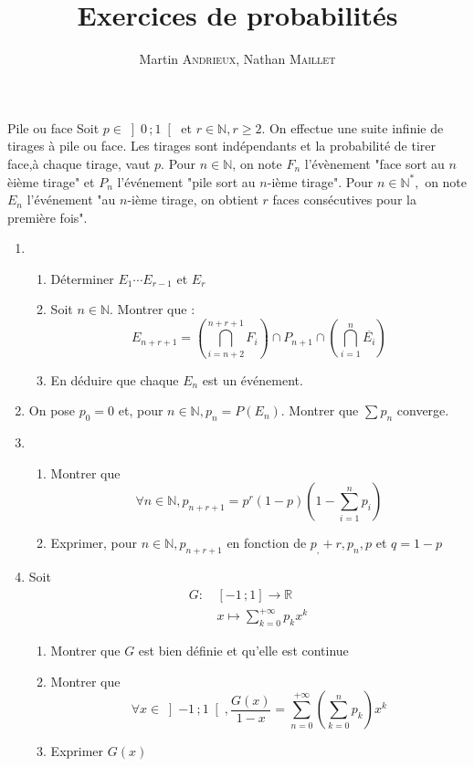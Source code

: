 \documentclass[french, a4paper, 11pt]{article}
\title{Exercices de probabilités}
\author{Martin \textsc{Andrieux}, Nathan \textsc{Maillet}}
\date{}
\newcommand{\N}{\mathbb{N}}   %
\newcommand{\R}{\mathbb{R}}   %
\newcommand{\interoo}[2]{\left]#1\,;#2\right[}   %
\newcommand{\interff}[2]{\left[#1\,;#2\right]}   %
\begin{document}
\maketitle

\begin{cadre}{Pile ou face}
  Soit \(p \in \interoo{0}{1}\) et \(r \in \N, r\geq 2\). On effectue une suite infinie de tirages à pile ou face.
  Les tirages sont indépendants et la probabilité de tirer face,à chaque tirage, vaut \(p\). Pour
  \(n\in \N\), on note \(F_n\) l'évènement "face sort au \(n\)èième tirage" et \(P_n\) l'événement "pile sort au \(n\)-ième
  tirage". Pour \(n \in \N^*,\) on note \(E_n\) l'événement "au \(n\)-ième tirage, on obtient \(r\) faces consécutives
  pour la première fois".
  \begin{enumerate}
    \item
      \begin{enumerate}
        \item Déterminer \(E_1 \cdots E_{r-1}\) et \(E_r\)
        \item Soit \(n \in \N\). Montrer que :
                \[E_{n+r+1}=\left(\bigcap_{i=n+2}^{n+r+1}F_i\right)\cap P_{n+1}\cap \left(\bigcap_{i=1}^{n}\overline{E_i}\right)\]
        \item En déduire que chaque \(E_n\) est un événement.
      \end{enumerate}
    \item On pose \(p_0=0\) et, pour \(n\in \N, p_n=P(E_n)\).
        Montrer que \(\sum p_n\) converge.
    \item 
      \begin{enumerate}
        \item Montrer que \[\forall n \in \N, p_{n+r+1}=p^r(1-p)\left(1-\sum_{i=1}^{n}p_i\right)\]
        \item Exprimer, pour \(n \in \N, p_{n+r+1}\) en fonction de \(p_,+r,p_n,p\) et \(q=1-p\)
      \end{enumerate}
    \item Soit \begin{align*}
                    G :\, & \interff{-1}{1} \rightarrow \R \\
                          & x \mapsto \sum_{k=0}^{+\infty}p_k x^k
                \end{align*}
          \begin{enumerate}
            \item Montrer que \(G\) est bien définie et qu'elle est continue
            \item Montrer que 
                  \[\forall x \in \interoo{-1}{1}, \frac{G(x)}{1-x}=\sum_{n=0}^{+\infty}\left(\sum_{k=0}^{n} p_k\right) x^k\]
            \item Exprimer \(G(x)\)
          \end{enumerate}
  \end{enumerate}
\end{cadre}
\end{document}
